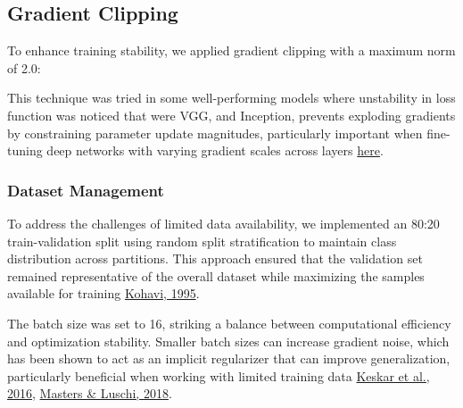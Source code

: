 \documentclass[a4paper,12pt]{article}
\begin{document}
 
\subsection{Gradient Clipping}
To enhance training stability, we applied gradient clipping with a maximum norm of 2.0:


This technique was tried in some well-performing models where unstability in loss function was noticed that were VGG, and Inception, prevents exploding gradients by constraining parameter update magnitudes, particularly important when fine-tuning deep networks with varying gradient scales across layers \href{http://proceedings.mlr.press/v28/pascanu13.pdf}{here}.

\subsubsection{Dataset Management}

To address the challenges of limited data availability, we implemented an 80:20 train-validation split using random split stratification to maintain class distribution across partitions. This approach ensured that the validation set remained representative of the overall dataset while maximizing the samples available for training {\href{https://dl.acm.org/doi/10.5555/1643031.1643047}{Kohavi, 1995}}.

The batch size was set to 16, striking a balance between computational efficiency and optimization stability. Smaller batch sizes can increase gradient noise, which has been shown to act as an implicit regularizer that can improve generalization, particularly beneficial when working with limited training data {\href{https://arxiv.org/abs/1609.04836}{Keskar et al., 2016}, \href{https://arxiv.org/abs/1804.07612}{Masters \& Luschi, 2018}}.
\end{document}
